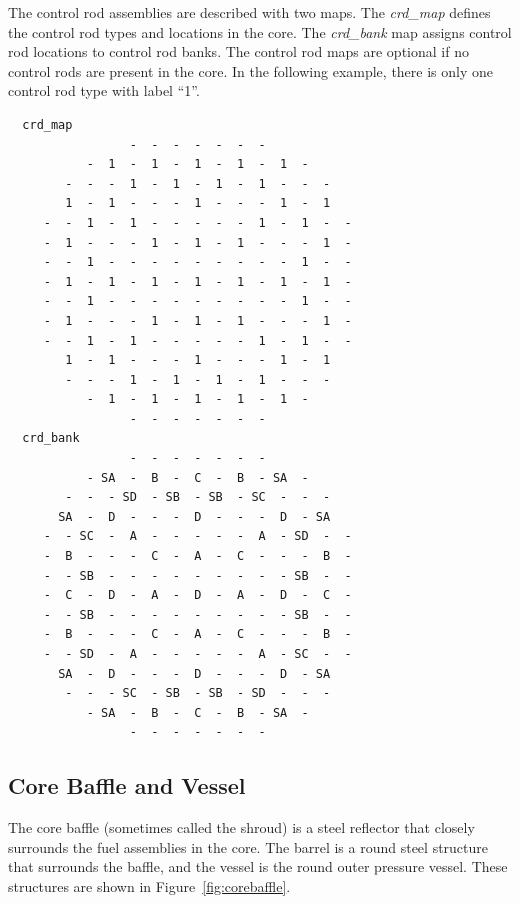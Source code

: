 The control rod assemblies are described with two maps.  The {\it crd\_map}
defines the control rod types and locations in the core.
The {\it crd\_bank} map assigns control rod locations to control rod banks.
The control rod maps are optional if no control rods are present in the core.
In the following example, there is only one control rod type with label ``1''.
\vfill   %
\begin{verbatim}
  crd_map
                 -  -  -  -  -  -  -
           -  1  -  1  -  1  -  1  -  1  -
        -  -  -  1  -  1  -  1  -  1  -  -  -
        1  -  1  -  -  -  1  -  -  -  1  -  1
     -  -  1  -  1  -  -  -  -  -  1  -  1  -  -
     -  1  -  -  -  1  -  1  -  1  -  -  -  1  -
     -  -  1  -  -  -  -  -  -  -  -  -  1  -  -
     -  1  -  1  -  1  -  1  -  1  -  1  -  1  -
     -  -  1  -  -  -  -  -  -  -  -  -  1  -  -
     -  1  -  -  -  1  -  1  -  1  -  -  -  1  -
     -  -  1  -  1  -  -  -  -  -  1  -  1  -  -
        1  -  1  -  -  -  1  -  -  -  1  -  1
        -  -  -  1  -  1  -  1  -  1  -  -  -
           -  1  -  1  -  1  -  1  -  1  -
                 -  -  -  -  -  -  -
  crd_bank
                 -  -  -  -  -  -  -
           - SA  -  B  -  C  -  B  - SA  -
        -  -  - SD  - SB  - SB  - SC  -  -  -
       SA  -  D  -  -  -  D  -  -  -  D  - SA
     -  - SC  -  A  -  -  -  -  -  A  - SD  -  -
     -  B  -  -  -  C  -  A  -  C  -  -  -  B  -
     -  - SB  -  -  -  -  -  -  -  -  - SB  -  -
     -  C  -  D  -  A  -  D  -  A  -  D  -  C  -
     -  - SB  -  -  -  -  -  -  -  -  - SB  -  -
     -  B  -  -  -  C  -  A  -  C  -  -  -  B  -
     -  - SD  -  A  -  -  -  -  -  A  - SC  -  -
       SA  -  D  -  -  -  D  -  -  -  D  - SA
        -  -  - SC  - SB  - SB  - SD  -  -  -
           - SA  -  B  -  C  -  B  - SA  -
                 -  -  -  -  -  -  -

\end{verbatim}

\subsection{Core Baffle and Vessel}

The core baffle (sometimes called the shroud) is a steel reflector that closely surrounds
the fuel assemblies in the core. The barrel is a round steel structure that surrounds the baffle, and
the vessel is the round outer pressure vessel.  These structures are shown in
Figure~\ref{fig:corebaffle}.

